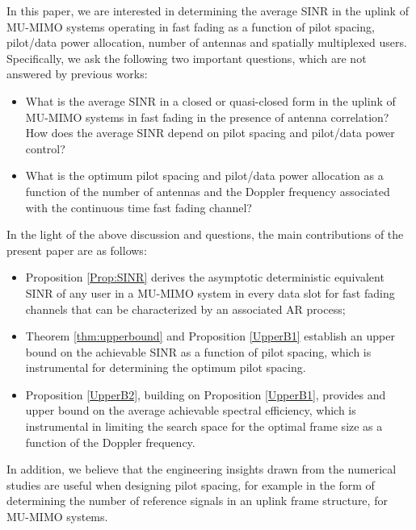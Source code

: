 \documentclass[conference, a4paper, 10pt]{IEEEtran}
\begin{document}
In this paper, we are interested in determining the average \ac{SINR} in the uplink of \ac{MU-MIMO} systems
operating in fast fading as a function of pilot spacing, pilot/data power allocation,
number of antennas and spatially multiplexed users. Specifically, we ask the following two important questions,
which are not answered by previous works:

\begin{itemize}
	\item
	What is the average \ac{SINR} in a closed or quasi-closed form in the uplink of \ac{MU-MIMO} systems
	in fast fading in the presence of antenna correlation?
	How does the average \ac{SINR} depend on pilot spacing and pilot/data power control?
	\item
	What is the optimum pilot spacing and pilot/data power allocation as a function of
	the number of antennas and the Doppler frequency associated with the continuous time fast fading channel?
\end{itemize}

In the light of the above discussion and questions, the main contributions of the present paper
are as follows:

\begin{itemize}
	\item
	Proposition \ref{Prop:SINR} derives the asymptotic deterministic equivalent \ac{SINR} of any user
	in a \ac{MU-MIMO} system
	in every data slot for fast fading channels that can be characterized by an associated \ac{AR} process;
	\item
	Theorem \ref{thm:upperbound} and Proposition \ref{UpperB1} establish an upper bound on the achievable \ac{SINR} as a function of
	pilot spacing, which is instrumental for determining the optimum pilot spacing.
	\item
	Proposition \ref{UpperB2}, building on Proposition \ref{UpperB1}, provides and upper bound on the average achievable spectral efficiency, which is instrumental in limiting the search space for the optimal frame size as a function of the Doppler frequency.
\end{itemize}
In addition, we believe that the engineering insights drawn from the numerical studies are
useful when designing pilot spacing, for example in the form of determining the number of reference signals in an uplink frame structure, for \ac{MU-MIMO} systems.
\end{document}
